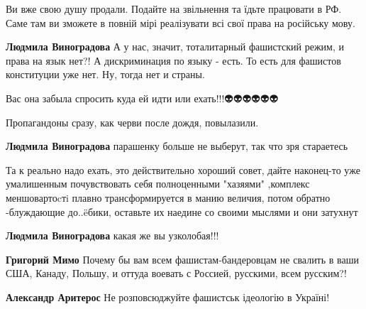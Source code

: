 \begin{itemize}
Ви вже свою душу продали. Подайте на звільнення та їдьте працювати в РФ. Саме
там ви зможете в повній мірі реалізувати всі свої права на російську мову.

\begin{itemize}

\textbf{Людмила Виноградова} А у нас, значит, тоталитарный фашистский режим, и
права на язык нет?! А дискриминация по языку - есть. То есть для фашистов
конституции уже нет. Ну, тогда нет и страны.


Вас она забыла спросить куда ей идти или ехать!!!👽👽👽👽👽👽


Пропагандоны сразу, как черви после дождя, повылазили.


\textbf{Людмила Виноградова} парашенку больше не выберут, так что зря стараетесь


Та к реально надо ехать, это действительно хороший совет, дайте наконец-то уже умалишенным почувствовать себя полноценными "хазяями" ,комплекс меншовартоcтi плавно трансформируется в манию величия, потом обратно -блуждающие до..ëбики, оставьте их наедине со своими мыслями и они затухнут


\textbf{Людмила Виноградова} какая же вы узколобая!!!


\textbf{Григорий Мимо} Почему бы вам всем фашистам-бандеровцам не свалить в ваши США, Канаду, Польшу, и оттуда воевать с Россией, русскими, всем русским?!


\textbf{Александр Аритерос} Не розповсюджуйте фашистськ ідеологію в Україні!


\end{itemize}
\end{itemize}
